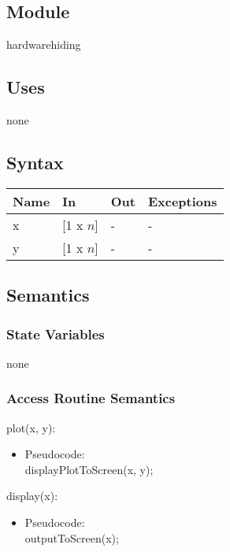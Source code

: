 \documentclass[12pt, titlepage]{article}
\begin{document}

\subsection{Module}
hardwarehiding

\subsection{Uses}

none

\subsection{Syntax}

\begin{center}
\begin{tabular}{p{4cm} p{4cm} p{4cm} p{2cm}}
\hline
\textbf{Name} & \textbf{In} & \textbf{Out} & \textbf{Exceptions} \\
\hline
x & [1 x $n$] & - & - \\
y & [1 x $n$] & - & - \\
\hline
\end{tabular}
\end{center}

\subsection{Semantics}

\subsubsection{State Variables}
none

\subsubsection{Access Routine Semantics}
plot(x, y):
\begin{itemize}
\item Pseudocode:\\
displayPlotToScreen(x, y); 
\end{itemize}
display(x):
\begin{itemize}
\item Pseudocode:\\
outputToScreen(x); 
\end{itemize}
\end{document}
